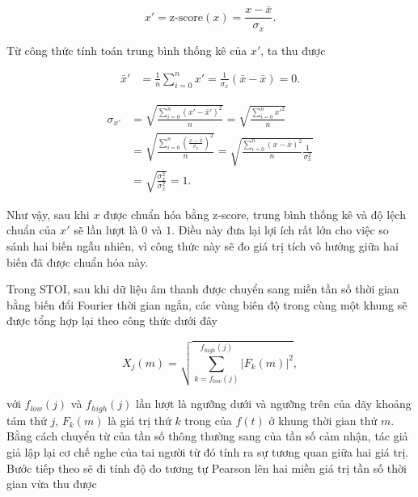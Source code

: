 				\begin{equation}
					x' = \text{z-score}(x) = \frac{x - \bar{x}}{\sigma_x}.
				\label{sound::zscore_formula}
				\end{equation}
			
			Từ công thức tính toán trung bình thống kê của $x'$, ta thu được
				
				\begin{equation*}
					\begin{aligned}
						\bar{x}' 	& = \frac{1}{n} \sum_{i=0}^n x' = \frac{1}{\sigma_x} (\bar{x} - \bar{x}) = 0.
					\end{aligned}
				\end{equation*}
			
				\begin{equation*}
					\begin{aligned}
						\sigma_{x'} & = \sqrt{\frac{\sum_{i=0}^n (x' - \bar{x}')^2}{n}} = \sqrt{\frac{\sum_{i=0}^n x'^2}{n}} \\
									& = \sqrt{\frac{\sum_{i=0}^n (\frac{x - \bar{x}}{\sigma_x})^2}{n}} = \sqrt{\frac{\sum_{i=0}^n (x - \bar{x})^2}{n} \frac{1}{\sigma_x^2}} \\
									& = \sqrt{\frac{\sigma_x^2}{\sigma_x^2}} = 1.
					\end{aligned}
				\end{equation*}
			
			Như vậy, sau khi $x$ được chuẩn hóa bằng z-score, trung bình thống kê và độ lệch chuẩn của $x'$ sẽ lần lượt là $0$ và $1$. Điều này đưa lại lợi ích rất lớn cho việc so sánh hai biến ngẫu nhiên, vì công thức này sẽ đo giá trị tích vô hướng giữa hai biến đã được chuẩn hóa này.
		
		 Trong STOI, sau khi dữ liệu âm thanh được chuyển sang miền tần số thời gian bằng biến đổi Fourier thời gian ngắn, các vùng biên độ trong cùng một khung sẽ được tổng hợp lại theo công thức dưới đây
			
				\begin{equation}
					X_j(m) = \sqrt{\sum_{k = f_{low}(j)}^{f_{high}(j)} |F_k(m)|^2},
				\end{equation}
				
			\noindent với $f_{low}(j)$ và $f_{high}(j)$ lần lượt là ngưỡng dưới và ngưỡng trên của dãy khoảng tám thứ $j$, $F_k(m)$ là giá trị thứ $k$ trong \spectrum{} của $f(t)$ ở khung thời gian thứ $m$. Bằng cách chuyển từ \spectrogram{} của tần số thông thường sang \spectrogram{} của tần số cảm nhận, tác giả giả lập lại cơ chế nghe của tai người từ đó tính ra sự tương quan giữa hai giá trị. Bước tiếp theo sẽ đi tính độ đo tương tự Pearson lên hai miền giá trị tần số thời gian vừa thu được
			
